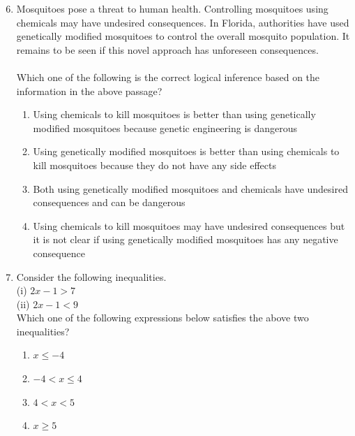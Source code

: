 \documentclass[journal]{IEEEtran}
\theoremstyle{remark}
\begin{document}
\begin{enumerate}[itemsep=1em]
\setcounter{enumi}{5}
\item Mosquitoes pose a threat to human health. Controlling mosquitoes using chemicals may have undesired consequences. In Florida, authorities have used genetically modified mosquitoes to control the overall mosquito population. It remains to be seen if this novel approach has unforeseen consequences. \\
\\
Which one of the following is the correct logical inference based on the information in the above passage? 
\begin{enumerate}[leftmargin=2.5em, labelsep=0.5em, itemsep=0.5em]
    \item Using chemicals to kill mosquitoes is better than using genetically modified mosquitoes because genetic engineering is dangerous 
    \item Using genetically modified mosquitoes is better than using chemicals to kill mosquitoes because they do not have any side effects 
    \item Both using genetically modified mosquitoes and chemicals have undesired consequences and can be dangerous
    \item Using chemicals to kill mosquitoes may have undesired consequences but it is not clear if using genetically modified mosquitoes has any negative consequence 
\end{enumerate}
\end{enumerate}

\begin{enumerate}[itemsep=1em]
\setcounter{enumi}{6}
\item Consider the following inequalities. \\
      (i) $2x-1>7$\\
      (ii) $2x-1<9$\\
Which one of the following expressions below satisfies the above two inequalities? 
\begin{multicols}{4}
\begin{enumerate}
    \item $x \leq -4$
    \item $-4 < x \leq 4$
    \item $4<x<5$
    \item $x \geq 5$
\end{enumerate}    
\end{multicols}
\end{enumerate}
\end{document}
